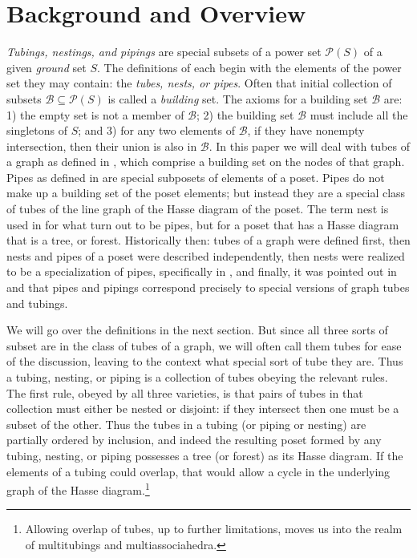 \documentclass{article}
\begin{document}
\section{Background and Overview}
\textit{Tubings, nestings, and pipings} are special subsets of a power set $\mathcal{P}(S)$ of a given \textit{ground} set $S$. The definitions of each begin with the elements of the power set they may contain: the \textit{tubes, nests, or pipes}. Often that initial collection of subsets $\mathcal{B}\subseteq \mathcal{P}(S)$ is called a \textit{building} set. The axioms for a building set $\mathcal{B}$ are: 1) the empty set is not a member of $\mathcal{B}$; 2) the building set  $\mathcal{B}$ must include all the singletons of $S$; and 3) for any two elements of $\mathcal{B}$, if they have nonempty intersection, then their union is also in $\mathcal{B}.$ In this paper we will deal with tubes of a graph as defined in \cite{cd}, which comprise a building set on the nodes of that graph. Pipes as defined in \cite{galashin} are special subposets of elements of a poset. Pipes do not make up a building set of the poset elements; but instead they are a special class of tubes of the line graph of the Hasse diagram of the poset. The term nest is used in \cite{laplante-anfossi} for what turn out to be  pipes, but for a poset that has a Hasse diagram that is a tree, or forest. Historically then: tubes of a graph were defined first, then nests and pipes of a poset were described independently, then nests were realized to be a specialization of pipes, specifically in \cite{defant2024operahedronlattices}, and finally, it was pointed out in \cite{mpp} and \cite{mppfull} that pipes and pipings correspond precisely to special versions of graph tubes and tubings. 

We will go over the definitions in the next section. But since all three sorts of subset are in the class of tubes of a graph, we will often call them tubes for ease of the discussion, leaving to the context what special sort of tube they are. Thus a tubing, nesting, or piping is a collection of tubes obeying the relevant rules. The first rule, obeyed by all three varieties, is that pairs of tubes in that collection must either be nested or disjoint: if they intersect then one must be a subset of the other. Thus the tubes in a tubing (or piping or nesting) are partially ordered by inclusion, and indeed the resulting poset formed by any tubing, nesting, or piping possesses a tree (or forest) as its Hasse diagram. If the elements of a tubing could overlap, that would allow a cycle in the underlying graph of the Hasse diagram.\footnote{Allowing overlap of tubes, up to further limitations, moves us into the realm of multitubings and multiassociahedra.}
\end{document}
